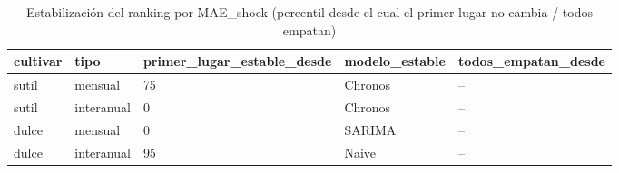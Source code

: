 \begin{table}[H]
\centering
\small
\caption{Estabilización del ranking por MAE\_shock (percentil desde el cual el primer lugar no cambia / todos empatan)}
\label{tab:T_barrido_estabilizacion}
\begin{tabular}{lllll}
\toprule
cultivar & tipo & primer\_lugar\_estable\_desde & modelo\_estable & todos\_empatan\_desde \\
\midrule
sutil & mensual & 75 & Chronos & -- \\
sutil & interanual & 0 & Chronos & -- \\
dulce & mensual & 0 & SARIMA & -- \\
dulce & interanual & 95 & Naive & -- \\
\bottomrule
\end{tabular}
\end{table}